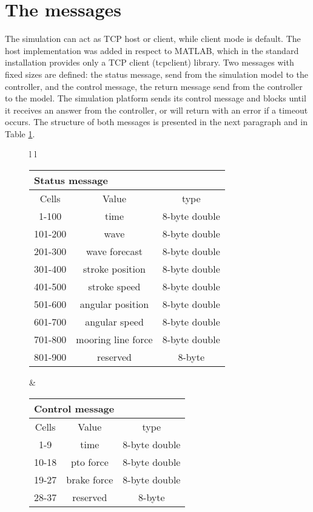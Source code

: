 \documentclass[oneside,10pt,a4paper]{book}
\begin{document}
\section{The messages}\label{sec:CI}
The simulation can act as TCP host or client, while client mode is default. The host implementation was added in respect to MATLAB, which in the standard installation provides only a TCP client (tcpclient) library. Two messages with fixed sizes are defined: the status message, send from the simulation model to the controller, and the control message, the return message send from the controller to the model. The simulation platform sends its control message and blocks until it receives an answer from the controller, or will return with an error if a timeout occurs. The structure of both messages is presented in the next paragraph and in Table \ref{tab:messages}.
\begin{figure}
	\centering
	\begin{tabular}{l l}
		
	
\begin{tabular}{|c c c|}
	\multicolumn{3}{l}{Status message}\\
	\hline
	Cells&Value&type\\
	\hline
	1-100&time&8-byte double\\
	101-200&wave&8-byte double\\
	201-300&wave forecast&8-byte double\\
	301-400&stroke position&8-byte double\\
	401-500&stroke speed&8-byte double\\
	501-600&angular position&8-byte double\\
	601-700&angular speed&8-byte double\\
	701-800&mooring line force&8-byte double\\
	801-900&reserved&8-byte\\
	\hline
\end{tabular}
&
\begin{tabular}{|c c c|}
	\multicolumn{3}{l}{Control message}\\
	\hline
	Cells&Value&type\\
	\hline
	1-9&time&8-byte double\\
	10-18&pto force&8-byte double\\
	19-27&brake force&8-byte double\\
	28-37&reserved&8-byte\\
	\hline
\end{tabular}\\
\end{tabular}\label{tab:messages}
\end{figure}
\end{document}

